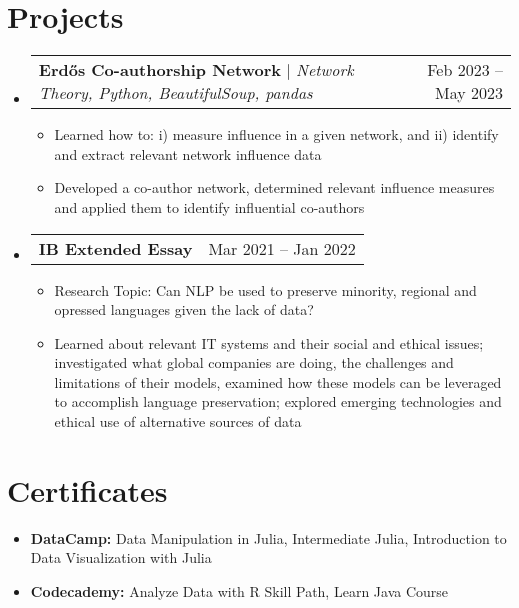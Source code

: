 \documentclass[letterpaper,10pt]{article}
\makeatletter
\newcommand{\resumeItem}[1]{
  \item\small{
    {#1 \vspace{-2pt}}
  }
}
\newcommand{\resumeSubheading}[4]{
  \vspace{-2pt}\item
    \begin{tabular*}{0.97\textwidth}[t]{l@{\extracolsep{\fill}}r}
      \textbf{#1} & #2 \\
      \textit{\small#3} & \textit{\small #4} \\
    \end{tabular*}\vspace{-7pt}
}
\newcommand{\resumeProjectHeading}[2]{
    \item
    \begin{tabular*}{0.97\textwidth}{l@{\extracolsep{\fill}}r}
      \small#1 & #2 \\
    \end{tabular*}\vspace{-7pt}
}
\newcommand{\resumeSubHeadingListStart}{\begin{itemize}[leftmargin=0.15in, label={}]}
\newcommand{\resumeSubHeadingListEnd}{\end{itemize}}
\newcommand{\resumeItemListStart}{\begin{itemize}}
\newcommand{\resumeItemListEnd}{\end{itemize}\vspace{-5pt}}
\makeatother
\begin{document}
\section{Projects}
    \resumeSubHeadingListStart
      \resumeProjectHeading
          {\textbf{Erd\H{o}s Co-authorship Network} $|$ \emph{Network Theory, Python, BeautifulSoup, pandas}}{Feb 2023 -- May 2023}
          \resumeItemListStart
            \resumeItem{Learned how to: i) measure influence in a given network, and ii) identify and extract relevant network influence data}
            \resumeItem{Developed a co-author network, determined relevant influence measures and applied them to identify influential co-authors}
          \resumeItemListEnd
      \resumeProjectHeading
          {\textbf{IB Extended Essay}}{Mar 2021 -- Jan 2022}
          \resumeItemListStart
            \resumeItem{Research Topic: Can NLP be used to preserve minority, regional and opressed languages given the lack of data?}
            \resumeItem{Learned about relevant IT systems and their social and ethical issues; investigated what global companies are doing, the challenges and limitations of their models, examined how these models can be leveraged to accomplish language preservation; explored emerging technologies and ethical use of alternative sources of data}
          \resumeItemListEnd
    \resumeSubHeadingListEnd


\section{Certificates}
 \begin{itemize}[leftmargin=0.15in, label={}]
     \resumeItem{\textbf{DataCamp:}{ Data Manipulation in Julia, Intermediate Julia, Introduction to Data Visualization with Julia}}\vspace{-5px}
     \resumeItem{\textbf{Codecademy:}{ Analyze Data with R Skill Path, Learn Java Course}}
 \end{itemize}




\end{document}
